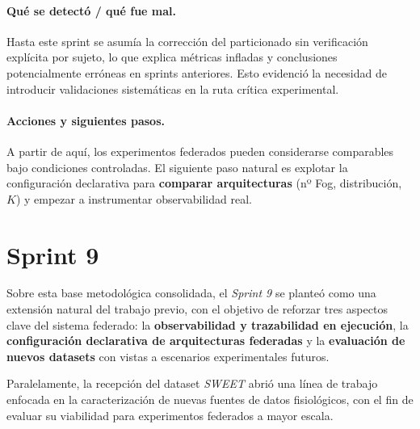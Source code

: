 \documentclass{report}
\begin{document}
\vspace{0.15em}
\paragraph{Qué se detectó / qué fue mal.}
Hasta este sprint se asumía la corrección del particionado sin verificación explícita por sujeto, lo que explica métricas infladas y conclusiones potencialmente erróneas en sprints anteriores. Esto evidenció la necesidad de introducir validaciones sistemáticas en la ruta crítica experimental.

\vspace{0.15em}
\paragraph{Acciones y siguientes pasos.}
A partir de aquí, los experimentos federados pueden considerarse comparables bajo condiciones controladas. El siguiente paso natural es explotar la configuración declarativa para \textbf{comparar arquitecturas} (nº Fog, distribución, $K$) y empezar a instrumentar observabilidad real.


\section{Sprint 9}
\label{sect:Sp9}
Sobre esta base metodológica consolidada, el \textit{Sprint 9} se planteó como una extensión natural del trabajo previo, con el objetivo de reforzar tres aspectos clave del sistema federado: la \textbf{observabilidad y trazabilidad en ejecución}, la \textbf{configuración declarativa de arquitecturas federadas} y la \textbf{evaluación de nuevos datasets} con vistas a escenarios experimentales futuros.

Paralelamente, la recepción del dataset \textit{SWEET} abrió una línea de trabajo enfocada en la caracterización de nuevas fuentes de datos fisiológicos, con el fin de evaluar su viabilidad para experimentos federados a mayor escala.
\end{document}
